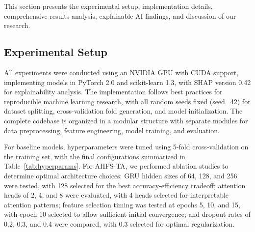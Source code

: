 \documentclass[journal]{IEEEtran}
\begin{document}
This section presents the experimental setup, implementation details, comprehensive results analysis, explainable AI findings, and discussion of our research.

\subsection{Experimental Setup}

All experiments were conducted using an NVIDIA GPU with CUDA support, implementing models in PyTorch 2.0 and scikit-learn 1.3, with SHAP version 0.42 for explainability analysis. The implementation follows best practices for reproducible machine learning research, with all random seeds fixed (seed=42) for dataset splitting, cross-validation fold generation, and model initialization. The complete codebase is organized in a modular structure with separate modules for data preprocessing, feature engineering, model training, and evaluation.

For baseline models, hyperparameters were tuned using 5-fold cross-validation on the training set, with the final configurations summarized in Table~\ref{tab:hyperparams}. For AHFS-TA, we performed ablation studies to determine optimal architecture choices: GRU hidden sizes of 64, 128, and 256 were tested, with 128 selected for the best accuracy-efficiency tradeoff; attention heads of 2, 4, and 8 were evaluated, with 4 heads selected for interpretable attention patterns; feature selection timing was tested at epochs 5, 10, and 15, with epoch 10 selected to allow sufficient initial convergence; and dropout rates of 0.2, 0.3, and 0.4 were compared, with 0.3 selected for optimal regularization.

\begin{table}[h]
\centering
\caption{Baseline Model Hyperparameters}
\label{tab:hyperparams}
\end{table}
\end{document}
